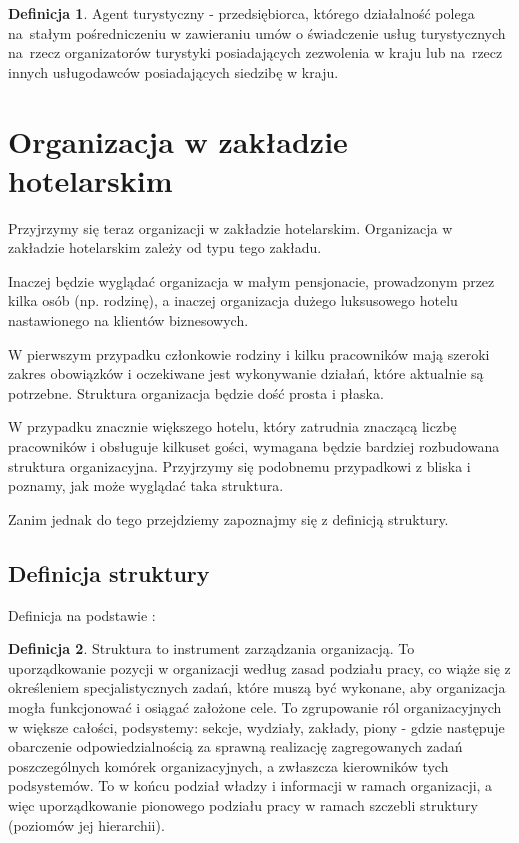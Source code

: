 \documentclass[a4paper,onecolumn,oneside,11pt,wide,floatssmall]{mwrep}
\theoremstyle{definition}
\newtheorem{defn}{Definicja}[section]
\theoremstyle{plain}%
\theoremstyle{remark}
\begin{document}
\begin{defn}{Agent turystyczny}
- przedsiębiorca, którego działalność polega \mbox{na stałym} pośredniczeniu w 
zawieraniu umów o świadczenie usług turystycznych \mbox{na rzecz} organizatorów 
turystyki posiadających zezwolenia w kraju lub \mbox{na rzecz} innych usługodawców 
posiadających siedzibę w kraju.
\end{defn}

\section{Organizacja w zakładzie hotelarskim}
Przyjrzymy się teraz organizacji w zakładzie hotelarskim. Organizacja w 
zakładzie hotelarskim zależy od typu tego zakładu.

Inaczej będzie wyglądać organizacja w małym pensjonacie, prowadzonym przez 
kilka osób (np. rodzinę), a inaczej organizacja dużego 
luksusowego hotelu nastawionego na klientów biznesowych. 

W pierwszym przypadku członkowie rodziny i kilku pracowników mają szeroki 
zakres obowiązków i oczekiwane jest wykonywanie działań, które aktualnie są 
potrzebne. Struktura organizacja będzie dość prosta i płaska.

W przypadku znacznie większego hotelu, który zatrudnia znaczącą liczbę 
pracowników i obsługuje kilkuset gości, wymagana będzie bardziej rozbudowana 
struktura organizacyjna. Przyjrzymy się podobnemu przypadkowi z bliska i 
poznamy, jak może wyglądać taka struktura. 

Zanim jednak do tego przejdziemy zapoznajmy się z definicją struktury.

\subsection{Definicja struktury}
Definicja na podstawie \cite{bk:def-struktury}:
\begin{defn}{Struktura} 
to instrument zarządzania organizacją. To uporządkowanie pozycji w 
organizacji według zasad podziału pracy, co wiąże się z określeniem 
specjalistycznych zadań, które muszą być wykonane, aby organizacja mogła 
funkcjonować i osiągać założone cele. To zgrupowanie ról organizacyjnych w 
większe całości, podsystemy: sekcje, wydziały, zakłady, piony - gdzie 
następuje obarczenie odpowiedzialnością za sprawną realizację zagregowanych 
zadań poszczególnych komórek organizacyjnych, a zwłaszcza kierowników tych 
podsystemów. To w końcu podział władzy i informacji w ramach organizacji, a 
więc uporządkowanie pionowego podziału pracy w ramach szczebli struktury 
(poziomów jej hierarchii).
\end{defn}
\end{document}
